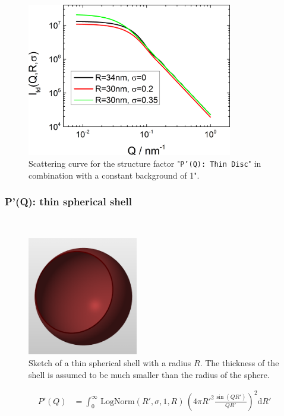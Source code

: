 \begin{figure}[htb]
\begin{center}
\includegraphics[width=0.8\textwidth,height=0.55\textwidth]{../images/form_factor/anisotropic/PprimeThinDisc.png}
\end{center}
\caption{Scattering curve for the structure factor "\texttt{P'(Q): Thin Disc}" in combination with a constant background of 1".}
\label{fig_IQ:PprimeThinDisc}
\end{figure}

\clearpage
\subsubsection{P'(Q): thin spherical shell} ~\\
\label{plugin:Pprime4spShell}

\begin{figure}[htb]
\begin{center}
\includegraphics[width=0.43\textwidth,height=0.463\textwidth]{../images/form_factor/anisotropic/Sphere_thin.png}
\end{center}
\caption{Sketch of a thin spherical shell with a radius $R$. The thickness of the shell is assumed to be much smaller than the radius of the sphere.}
\label{fig:ThinSphericalShell}
\end{figure}
\begin{align}
P'(Q) &= \int_0^\infty \, \mathrm{LogNorm}(R',\sigma,1,R)\, \left(4\pi R'^2\frac{\sin(QR')}{QR'}\right)^2 \mathrm{d}R'
\label{eq:PprimeSphSh}
\end{align}

